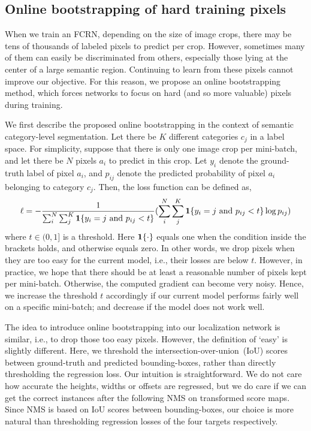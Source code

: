 \documentclass{article}
\begin{document}
\subsection{Online bootstrapping of hard training pixels}


When we train an FCRN, depending on the size of image crops, there may be tens of thousands of labeled pixels to predict per crop.
However, sometimes many of them can easily be discriminated from others,
especially those lying at the center of a large semantic region.
Continuing to learn from these pixels cannot improve our objective.
For this reason,
we propose an online bootstrapping method, which forces networks to
focus on hard (and so more valuable) pixels during training.



We first describe the proposed online bootstrapping in the context of semantic  category-level segmentation.
Let there be $K$ different categories $c_j$ in a label space.
For simplicity, suppose that there is only one image crop per mini-batch, and let there be $N$ pixels $a_i$ to predict in this crop.
Let $y_i$ denote the ground-truth label of pixel $a_i$, and $p_{ij}$ denote the predicted probability of pixel $a_i$ belonging to category $c_j$.
Then, the loss function can be defined as,
\begin{equation}
\ell = - \frac{1}{ \sum_{i}^{N} \sum_{j}^{K}  {\bf 1}\{y_i = j \textrm{ and } p_{ij} < t\} } ( \sum_{i}^{N} \sum_{j}^{K}
                        {\bf 1}\{y_i = j \textrm{ and } p_{ij} < t\} \log p_{ij})
\end{equation}
where $t \in (0, 1]$ is a threshold. Here
${\bf 1} \{\cdot\}$ equals one when the condition inside the brackets holds, and otherwise equals zero.
In other words, we drop pixels when they are too easy for the current model, i.e., their losses are below $t$.
However, in practice, we hope that there should be at least a reasonable number of pixels kept per mini-batch.
Otherwise, the computed gradient can become very noisy.
Hence, we  increase the threshold $t$ accordingly if our current model performs fairly well on a specific mini-batch;
and decrease if the model does not work well.




The idea to introduce online bootstrapping into our localization network is similar, i.e., to drop those too easy pixels.
However, the definition of `easy' is slightly different.
Here, we threshold the intersection-over-union~(IoU) scores between ground-truth and predicted bounding-boxes, rather than directly thresholding the regression loss.
Our intuition is straightforward.
We do not care how accurate the heights, widths or offsets are regressed, but we do care if we can get the correct instances after the following NMS on transformed score maps.
Since NMS is based on IoU scores between bounding-boxes, our choice is more natural than thresholding regression losses of the four targets respectively.
\end{document}
